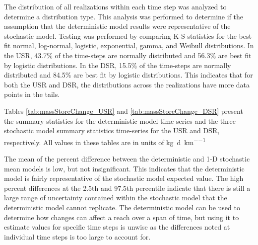 The distribution of all realizations within each time step was analyzed to determine a distribution type.  This analysis was performed to determine if the assumption that the deterministic model results were representative of the stochastic model.  Testing was performed by comparing K-S statistics for the best fit normal, log-normal, logistic, exponential, gamma, and Weibull distributions.  In the USR, 43.7\% of the time-steps are normally distributed and 56.3\% are best fit by logistic distributions.  In the DSR, 15.5\% of the time-steps are normally distributed and 84.5\% are best fit by logistic distributions.  This indicates that for both the USR and DSR, the distributions across the realizations have more data points in the tails.

Tables \ref{tab:massStoreChange_USR} and \ref{tab:massStoreChange_DSR} present the summary statistics for the deterministic model time-series and the three stochastic model summary statistics time-series for the USR and DSR, respectively.  All values in these tables are in units of \si{\kilo\gram\per\day\per\kilo\meter}

\subtabletop
\begin{table}[htbp]
	\centering
	\caption[USR river reach deterministic and stochastic dissolved selenium mass storage change time series summary statistics.]{USR river reach deterministic and stochastic dissolved selenium mass storage change time series summary statistics.  Values are in units of \si{\kilo\gram\per\day\per\kilo\meter}.}
	\label{tab:massStoreChange_USR}
	
\end{table}
\tablevspace
\subtabletop
\begin{table}[htbp]
	\centering
	\caption[DSR river reach deterministic and stochastic dissolved selenium mass storage change time series summary statistics.]{DSR river reach deterministic and stochastic dissolved selenium mass storage change time series summary statistics.  Values are in units of \si{\kilo\gram\per\day\per\kilo\meter}.}
	\label{tab:massStoreChange_DSR}
	
\end{table}

The mean of the percent difference between the deterministic and 1-D stochastic mean models is low, but not insignificant.  This indicates that the deterministic model is fairly representative of the stochastic model expected value.  The high percent differences at the 2.5th and 97.5th percentile indicate that there is still a large range of uncertainty contained within the stochastic model that the deterministic model cannot replicate.  The deterministic model can be used to determine how changes can affect a reach over a span of time, but using it to estimate values for specific time steps is unwise as the differences noted at individual time steps is too large to account for.


